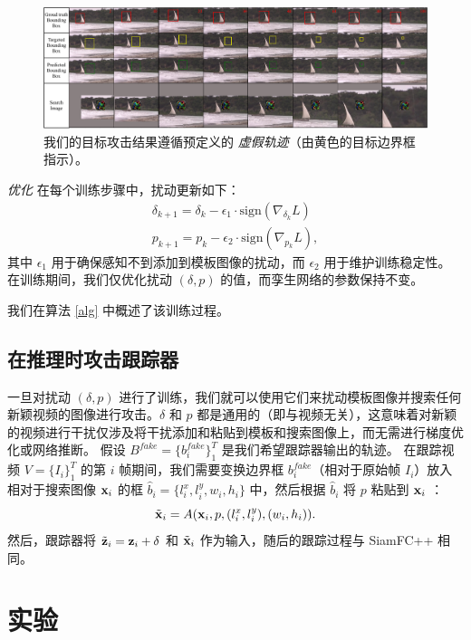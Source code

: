 \begin{figure}[t]
\centering
\includegraphics[width=1.0\textwidth]{Img/attack/vis_v4.pdf}
\caption{我们的目标攻击结果遵循预定义的 \textit{虚假轨迹}（由黄色的目标边界框指示）。}
\label{fig:vis}
\end{figure}

\textit{优化} 在每个训练步骤中，扰动更新如下：
\begin{gather}
\delta_{k+1} = \delta_{k} - \epsilon_1 \cdot \text{sign}(\nabla_{\delta_k}L)\\
p_{k+1} = p_{k} - \epsilon_2 \cdot \text{sign}(\nabla_{p_k}L),
\end{gather}
其中 $\epsilon_1$ 用于确保感知不到添加到模板图像的扰动，而 $\epsilon_2$ 用于维护训练稳定性。
在训练期间，我们仅优化扰动 $(\delta, p)$ 的值，而孪生网络的参数保持不变。

我们在算法 \ref{alg} 中概述了该训练过程。

\subsection{在推理时攻击跟踪器}

一旦对扰动 $(\delta, p)$ 进行了训练，我们就可以使用它们来扰动模板图像并搜索任何新颖视频的图像进行攻击。$\delta$ 和 $p$ 都是通用的（即与视频无关），这意味着对新颖的视频进行干扰仅涉及将干扰添加和粘贴到模板和搜索图像上，而无需进行梯度优化或网络推断。
假设 $B^{fake}=\{b^{fake}_i\}_1^{T}$ 是我们希望跟踪器输出的轨迹。
在跟踪视频 $V=\{I_i\}_1^T$ 的第 $i$ 帧期间，我们需要变换边界框 $b^{fake}_i$（相对于原始帧 $I_i$）放入相对于搜索图像 $\textbf x_i$ 的框 $\hat b_i=\{l^x_i, l^y_i, w_i, h_i\}$ 中，然后根据 $\hat b_i$ 将 $p$ 粘贴到 $\textbf x_i$ ：
\begin{equation}
\tilde{\textbf x}_i = A(\textbf x_i, p, (l^x_i, l^y_i), (w_i, h_i)).
\end{equation}
然后，跟踪器将 $\tilde{\textbf z}_i=\textbf z_i+\delta$ 和 $\tilde{\textbf x}_i$ 作为输入，随后的跟踪过程与 SiamFC++ 相同。

\section{实验}

